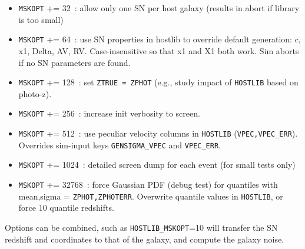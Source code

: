 \documentclass[12pt]{article}
\newcommand{\zhelio}{z_{\rm hel}}
\newcommand{\zcmb}{z_{\rm cmb}}
\newcommand{\vpec}{{\rm v}_{\rm pec}}
\newcommand{\ztrue}{{\tt ZTRUE}}
\begin{document}
{\begin{itemize}
      $\zhelio=$~\ztrue;  $\zcmb$ and $\mu$ are updated
      to account for new $\zhelio$ and generated $\vpec$.
%
\item {\tt MSKOPT} += 32~: allow only one SN per host galaxy 
                         (results in abort if library is too small)
%
\item {\tt MSKOPT} += 64~: 
  use SN properties in hostlib to override default generation:
  c, x1, Delta, AV, RV.
  Case-insensitive so that x1 and X1 both work.
  Sim aborts if no SN parameters are found.
%
\item {\tt MSKOPT} += 128~: set {\tt ZTRUE = ZPHOT} 
     (e.g., study impact of {\tt HOSTLIB} based on photo-z).
%
\item {\tt MSKOPT} += 256~: increase init verbosity to screen.
%
\item {\tt MSKOPT} += 512~: use peculiar velocity columns in {\tt HOSTLIB}
       ({\tt VPEC,VPEC\_ERR}). \\
       Overrides sim-input keys {\tt GENSIGMA\_VPEC} and {\tt VPEC\_ERR}.
%
\item {\tt MSKOPT} += 1024~: detailed screen dump
        for each event (for small tests only)
%
\item {\tt MSKOPT} += 32768~: force Gaussian PDF (debug test) for quantiles with
        mean,sigma = {\tt ZPHOT,ZPHOTERR}. Overwrite quantile values in 
        {\tt HOSTLIB}, or force 10 quantile redshifts.
%
\end{itemize}
%
Options can be combined, such as {\tt HOSTLIB\_MSKOPT}=10
will transfer the SN redshift and coordinates to that of
the galaxy, and compute the galaxy noise.

}
\end{document}

